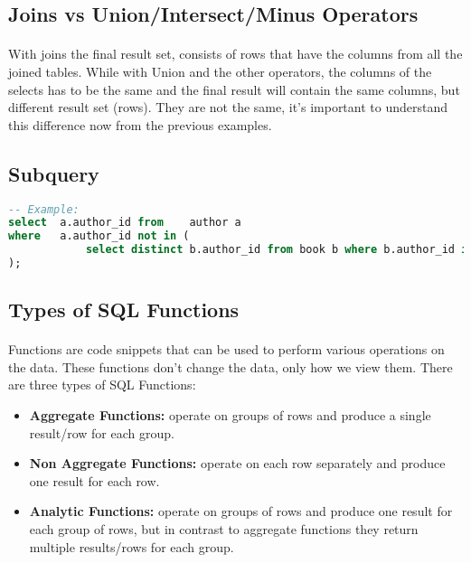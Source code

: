 \subsection{Joins vs Union/Intersect/Minus Operators}
\paragraph{} With joins the final result set, consists of rows that have the columns from all the joined tables. While with Union and the other operators, the columns of the selects has to be the same and the final result will contain the same columns, but different result set (rows). They are not the same, it's important to understand this difference now from the previous examples.
\subsection{Subquery}
\begin{lstlisting}[language=SQL]
-- Example:
select	a.author_id from	author a
where	a.author_id not in (
			select distinct b.author_id from book b where b.author_id is not null
);
\end{lstlisting}
\subsection{Types of SQL Functions}
\paragraph{} Functions are code snippets that can be used to perform various operations on the data. These functions don't change the data, only how we view them. There are three types of SQL Functions:
\begin{itemize}
	\item \textbf{Aggregate Functions:} operate on groups of rows and produce a single result/row for each group.
	\item \textbf{Non Aggregate Functions:} operate on each row separately and produce one result for each row.
	\item \textbf{Analytic Functions:} operate on groups of rows and produce one result for each group of rows, but in contrast to aggregate functions they return multiple results/rows for each group.
\end{itemize}
